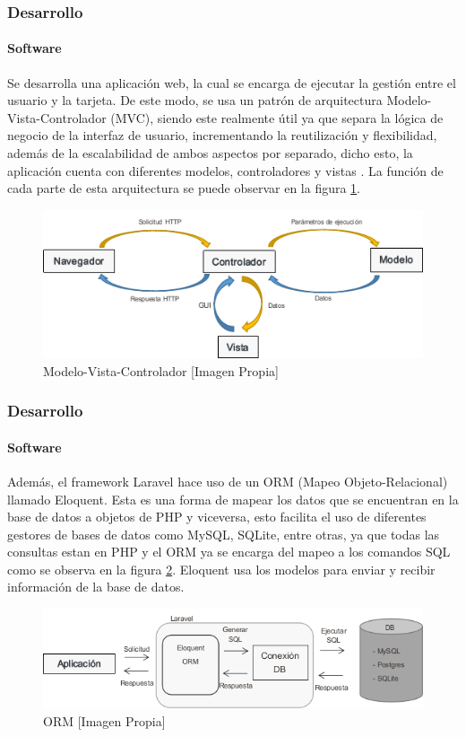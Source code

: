 \begin{frame}
\frametitle{Desarrollo}
\framesubtitle{Software}
\small
Se desarrolla una aplicación web, la cual se encarga de ejecutar la gestión entre el usuario y la tarjeta. De este modo, se usa un patrón de arquitectura Modelo-Vista-Controlador (MVC), siendo este realmente útil ya que separa la lógica de negocio de la interfaz de usuario, incrementando la reutilización y flexibilidad, además de la escalabilidad de ambos aspectos por separado, dicho esto, la aplicación cuenta con diferentes modelos, controladores y vistas \cite{MVC1}. La función de cada parte de esta arquitectura se puede observar en la figura \ref{fig:mvc}.
\begin{figure}[H]
	\centering
	\caption{Modelo-Vista-Controlador [Imagen Propia]}
	\label{fig:mvc}
	\includegraphics[width=0.55\linewidth]{Imagenes/MVC}
\end{figure}

\end{frame}

\begin{frame}[t]
\frametitle{Desarrollo}
\framesubtitle{Software}
\small
Además, el framework Laravel hace uso de un ORM (Mapeo Objeto-Relacional) llamado Eloquent. Esta es una forma de mapear los datos que se encuentran en la base de datos a objetos de PHP y viceversa, esto facilita el uso de diferentes gestores de bases de datos como MySQL, SQLite, entre otras, ya que todas las consultas estan en PHP y el ORM ya se encarga del mapeo a los comandos SQL como se observa en la figura \ref{fig:orm}. Eloquent usa los modelos para enviar y recibir información de la base de datos\cite{Eloq}.\\

\begin{figure}[H]
	\centering
	\caption[ORM]{ORM [Imagen Propia]}
	\label{fig:orm}
	\includegraphics[width=0.7\linewidth]{Imagenes/ORM}
\end{figure}

\end{frame}

